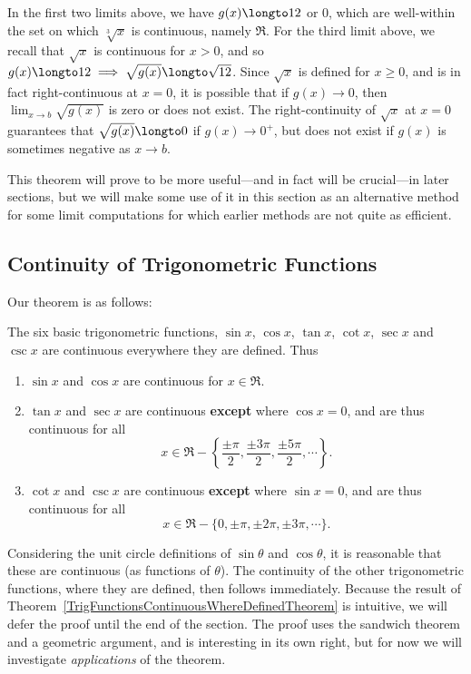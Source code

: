 \eex
In the first two limits above, we have $g(x)\longto12$ or $0$, which
are well-within the set on which  $\sqrt[3]{x}$
is  continuous, namely $\Re$.
For the third limit above, we 
recall that 
$\sqrt{x}$ is continuous for $x>0$, and so 
$g(x)\longto12\implies\sqrt{g(x)}\longto\sqrt{12}$.  
Since $\sqrt{x}$ is defined for
$x\ge0$, and is in fact right-continuous at $x=0$, it is 
possible that if $g(x)\to0$,
then $\lim_{x\to b}\sqrt{g(x)}$ is zero or does not exist.
The right-continuity of $\sqrt{x}$ at $x=0$ guarantees that
$\sqrt{g(x)}\longto0$ if $g(x)\to0^+$, but does not exist if
$g(x)$ is sometimes negative as $x\to b$.






This theorem will prove to be more useful---and in fact will be
crucial---in later sections, but we will make some use of it
in this section as an alternative method for some limit computations
for which earlier methods are not quite as efficient.


\subsection{Continuity of Trigonometric Functions}

Our theorem is as follows:
\begin{theorem}
The six basic trigonometric functions, $\sin x$, $\cos x$, 
$\tan x$, $\cot x$, $\sec x$ and $\csc x$ are continuous
everywhere they are defined.  Thus
\begin{enumerate}
\item $\sin x$ and $\cos x$ are continuous for $x\in\Re$.
\item $\tan x$ and $\sec x$ are continuous {\bf except} where $\cos x=0$,
      and  are thus continuous for all
       $$x\in\Re-\left\{\frac{\pm \pi}2,\frac{\pm3\pi}2,
            \frac{\pm5\pi}{2},\cdots\right\}.$$
\item $\cot x$ and $\csc x$ are continuous {\bf except} where $\sin x=0$,
      and  are thus continuous for all
      $$x\in\Re-\{0,\pm\pi,\pm2\pi,\pm3\pi,\cdots\}.$$
\end{enumerate}
\label{TrigFunctionsContinuousWhereDefinedTheorem}\end{theorem}

Considering the unit circle definitions of $\sin\theta$ and $\cos\theta$,
it is reasonable that these are continuous (as functions of $\theta$).
The continuity of the other trigonometric functions,  where
they are defined, then follows immediately.
Because the result of 
Theorem~\ref{TrigFunctionsContinuousWhereDefinedTheorem}
is intuitive, we will defer the proof until the end of the section.
The proof uses the sandwich theorem and a geometric argument,
and is interesting in its own right, but for now we will 
investigate {\it applications} of the theorem. 






